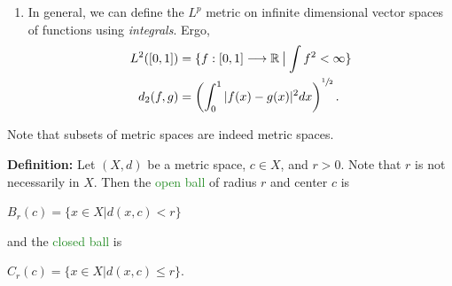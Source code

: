 \documentclass{article}
\newcommand{\Divides}{\mathbin{\big|}}
\begin{document}
\begin{enumerate}
\begin{center}
        $d(f,g) = \sup{\{| f(x) - g(x)| \Divides x \in [0,1]\}}$
    \end{center}
    is known as the \textcolor{ForestGreen}{"sup metric"} (a.k.a. \textcolor{ForestGreen}{$L^{\infty}$ metric} a.k.a. \textcolor{ForestGreen}{uniform metric}.
    \item In general, we can define the $L^p$ metric on infinite dimensional vector spaces of functions using \textit{integrals}. Ergo, 
    \begin{align*}
        L^2([0,1]) &= \{f:[0,1] \longrightarrow \mathbb{R} \Divides \int{f^2} < \infty\}\\
        d_2(f,g) &= \left( \int_0^1 |f(x)-g(x)|^2dx \right)^{\sfrac{1}{2}}.
    \end{align*}
\end{enumerate}

Note that subsets of metric spaces are indeed metric spaces.

\textbf{Definition:} Let $(X,d)$ be a metric space, $c \in X$, and $r>0$. Note that $r$ is not necessarily in $X$. Then the \textcolor{ForestGreen}{open ball} of radius $r$ and center $c$ is
\begin{center}
    $B_r(c) = \{x \in X \Divides d(x,c) < r\}$
\end{center}

and the \textcolor{ForestGreen}{closed ball} is 
\begin{center}
    $C_r(c) = \{x \in X \Divides d(x,c) \leq r\}$.
\end{center}
\end{document}
